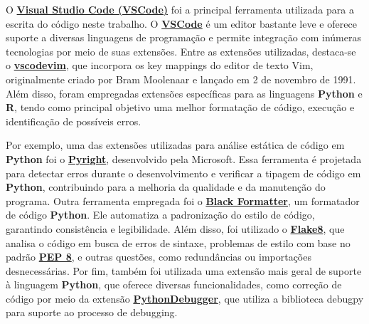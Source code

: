 \documentclass[
  12pt,
  a4paper,
]{scrreprt}
\begin{document}
\vspace{12pt}

O \href{https://code.visualstudio.com/}{\textbf{Visual Studio Code
(VSCode)}} foi a principal ferramenta utilizada para a escrita do código
neste trabalho. O \href{https://code.visualstudio.com/}{\textbf{VSCode}}
é um editor bastante leve e oferece suporte a diversas linguagens de
programação e permite integração com inúmeras tecnologias por meio de
suas extensões. Entre as extensões utilizadas, destaca-se o
\href{https://marketplace.visualstudio.com/items?itemName=vscodevim.vim}{\textbf{vscodevim}},
que incorpora os key mappings do editor de texto Vim, originalmente
criado por Bram Moolenaar e lançado em 2 de novembro de 1991. Além
disso, foram empregadas extensões específicas para as linguagens
\textbf{Python} e \textbf{R}, tendo como principal objetivo uma melhor
formatação de código, execução e identificação de possíveis erros.

\vspace{12pt}

Por exemplo, uma das extensões utilizadas para análise estática de
código em \textbf{Python} foi o
\href{https://marketplace.visualstudio.com/items?itemName=ms-pyright.pyright}{\textbf{Pyright}},
desenvolvido pela Microsoft. Essa ferramenta é projetada para detectar
erros durante o desenvolvimento e verificar a tipagem de código em
\textbf{Python}, contribuindo para a melhoria da qualidade e da
manutenção do programa. Outra ferramenta empregada foi o
\href{https://marketplace.visualstudio.com/items?itemName=ms-python.black-formatter}{\textbf{Black
Formatter}}, um formatador de código \textbf{Python}. Ele automatiza a
padronização do estilo de código, garantindo consistência e
legibilidade. Além disso, foi utilizado o
\href{https://marketplace.visualstudio.com/items?itemName=ms-python.flake8}{\textbf{Flake8}},
que analisa o código em busca de erros de sintaxe, problemas de estilo
com base no padrão \href{https://peps.python.org/pep-0008/}{\textbf{PEP
8}}, e outras questões, como redundâncias ou importações desnecessárias.
Por fim, também foi utilizada uma extensão mais geral de suporte à
linguagem \textbf{Python}, que oferece diversas funcionalidades, como
correção de código por meio da extensão
\href{https://marketplace.visualstudio.com/items?itemName=ms-python.debugpy}{\textbf{PythonDebugger}},
que utiliza a biblioteca debugpy para suporte ao processo de debugging.

\vspace{12pt}
\end{document}

